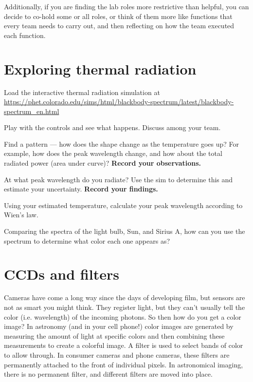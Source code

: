 Additionally, if you are finding the lab roles more restrictive than helpful, you can decide to co-hold some or all roles, or think of them more like functions that every team needs to carry out, and then reflecting on how the team executed each function.

\section{Exploring thermal radiation}\label{ic:sec:exploring}

\begin{steps}
	\item\label{ic:step:load-sim} Load the interactive thermal radiation simulation at \url{https://phet.colorado.edu/sims/html/blackbody-spectrum/latest/blackbody-spectrum_en.html}
	
	\item Play with the controls and see what happens. Discuss among your team.
	
	\item Find a pattern --- how does the shape change as the temperature goes up? For example, how does the peak wavelength change, and how about the total radiated power (area under curve)? \textbf{Record your observations.}
	
	\item At what peak wavelength do you radiate? Use the sim to determine this and estimate your uncertainty. \textbf{Record your findings.}
	
	\item Using your estimated temperature, calculate your peak wavelength according to Wien's law.
	
	\item\label{ic:step:qual-color} Comparing the spectra of the light bulb, Sun, and Sirius A, how can you use the spectrum to determine what color each one appears as?
\end{steps}

\section{CCDs and filters}

Cameras have come a long way since the days of developing film, but sensors are not as smart you might think. They register light, but they can't usually tell the color (i.e. wavelength) of the incoming photons. So then how do you get a color image? In astronomy (and in your cell phone!) color images are generated by measuring the amount of light at specific colors and then combining these measurements to create a colorful image. A filter is used to select bands of color to allow through. In consumer cameras and phone cameras, these filters are permanently attached to the front of individual pixels. In astronomical imaging, there is no permanent filter, and different filters are moved into place.

